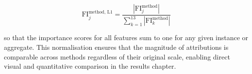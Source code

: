 \begin{equation}
\text{FI}^{\text{method, L1}}_j = \frac{|\text{FI}^{\text{method}}_j|}{\sum_{k=1}^{13}|\text{FI}^{\text{method}}_k|}
\end{equation}

so that the importance scores for all features sum to one for any given instance or aggregate. This normalisation ensures that the magnitude of attributions is comparable across methods regardless of their original scale, enabling direct visual and quantitative comparison in the results chapter. 
